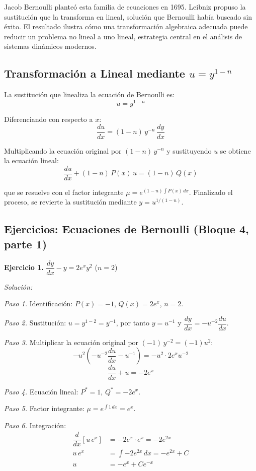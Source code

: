 \documentclass[12pt,letterpaper]{report}
\numberwithin{equation}{chapter}
\numberwithin{figure}{chapter}
\numberwithin{table}{chapter}
\begin{document}
Jacob Bernoulli planteó esta familia de ecuaciones en 1695. Leibniz propuso la sustitución que la transforma en lineal, solución que Bernoulli había buscado sin éxito. El resultado ilustra cómo una transformación algebraica adecuada puede reducir un problema no lineal a uno lineal, estrategia central en el análisis de sistemas dinámicos modernos.

\subsection{Transformación a Lineal mediante $u = y^{1-n}$}

La sustitución que linealiza la ecuación de Bernoulli es:
\[
u = y^{1-n}
\]

Diferenciando con respecto a $x$:
\[
\dfrac{du}{dx} = (1 - n)\,y^{-n}\,\dfrac{dy}{dx}
\]

Multiplicando la ecuación original por $(1 - n)\,y^{-n}$ y sustituyendo $u$ se obtiene la ecuación lineal:
\begin{equation*}
\dfrac{du}{dx} + (1 - n)\,P(x)\,u = (1 - n)\,Q(x)
\end{equation*}

que se resuelve con el factor integrante $\mu = e^{(1-n)\int P(x)\,dx}$. Finalizado el proceso, se revierte la sustitución mediante $y = u^{1/(1-n)}$.

\subsection{Ejercicios: Ecuaciones de Bernoulli (Bloque 4, parte 1)}

\textbf{Ejercicio 1.} $\dfrac{dy}{dx} - y = 2e^{x}y^{2}$ \quad ($n = 2$)

\textit{Solución:}

\textit{Paso 1.} Identificación: $P(x) = -1$, $Q(x) = 2e^{x}$, $n = 2$.

\textit{Paso 2.} Sustitución: $u = y^{1-2} = y^{-1}$, por tanto $y = u^{-1}$ y $\dfrac{dy}{dx} = -u^{-2}\dfrac{du}{dx}$.

\textit{Paso 3.} Multiplicar la ecuación original por $(-1)\,y^{-2} = (-1)u^{2}$:
\[
-u^{2}\!\left(-u^{-2}\dfrac{du}{dx} - u^{-1}\right) = -u^{2}\cdot 2e^{x}u^{-2}
\]
\[
\dfrac{du}{dx} + u = -2e^{x}
\]

\textit{Paso 4.} Ecuación lineal: $P^{*} = 1$, $Q^{*} = -2e^{x}$.

\textit{Paso 5.} Factor integrante: $\mu = e^{\int 1\,dx} = e^{x}$.

\textit{Paso 6.} Integración:
\begin{align*}
\dfrac{d}{dx}\!\left[u\,e^{x}\right] &= -2e^{x}\cdot e^{x} = -2e^{2x} \\[4pt]
u\,e^{x} &= \int -2e^{2x}\,dx = -e^{2x} + C \\[4pt]
u &= -e^{x} + Ce^{-x}
\end{align*}
\end{document}
